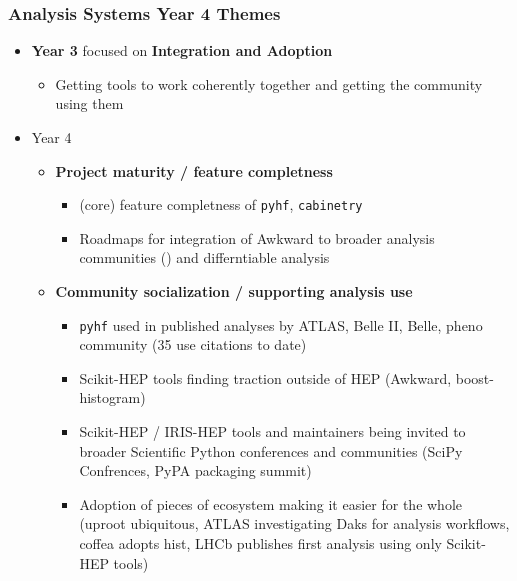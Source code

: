 \begin{frame}
  \frametitle{Analysis Systems Year 4 Themes}

  \begin{itemize}\setlength{\itemsep}{0.25 cm}
    \item \textbf{Year 3} focused on \textbf{Integration and Adoption}
    \begin{itemize}
      \item Getting tools to work coherently together and getting the community using them
    \end{itemize}
    \item Year 4
    \begin{itemize}
      \item \textbf{Project maturity / feature completness}
      \begin{itemize}
        \item (core) feature completness of \texttt{pyhf}, \texttt{cabinetry}
        \item Roadmaps for integration of Awkward to broader analysis communities () and differntiable analysis
      \end{itemize}
      \item \textbf{Community socialization / supporting analysis use}
      \begin{itemize}
        \item \texttt{pyhf} used in published analyses by ATLAS, Belle II, Belle, pheno community (35 use citations to date)
        \item Scikit-HEP tools finding traction outside of HEP (Awkward, boost-histogram)
        \item Scikit-HEP / IRIS-HEP tools and maintainers being invited to broader Scientific Python conferences and communities (SciPy Confrences, PyPA packaging summit)
        \item Adoption of pieces of ecosystem making it easier for the whole (uproot ubiquitous, ATLAS investigating Daks for analysis workflows, coffea adopts hist, LHCb publishes first analysis using only Scikit-HEP tools)
      \end{itemize}
    \end{itemize}
  \end{itemize}

\end{frame}

